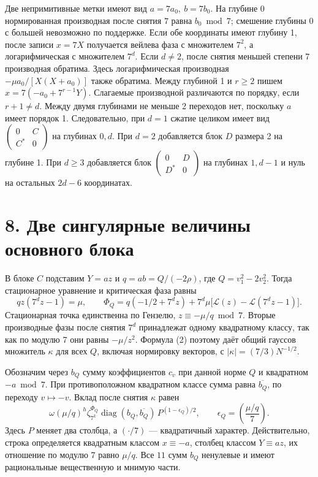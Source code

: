 \documentclass[11pt,a4paper]{article}
\newcommand{\C}{\mathbb C}
\newcommand{\sect}[1]{\section*{\sffamily\color{ink}#1}}
\newcommand{\diag}{\operatorname{diag}}
\begin{document}
Две непримитивные метки имеют вид \(a=7a_0,\ b=7b_0\). На глубине 0 нормированная производная после снятия \(7\) равна \(b_0\bmod7\); смешение глубины 0 с большей невозможно по поддержке. Если обе координаты имеют глубину 1, после записи \(x=7X\) получается вейлева фаза с множителем \(7^2\), а логарифмическая с множителем \(7^d\). Если \(d\ne2\), после снятия меньшей степени 7 производная обратима. Здесь логарифмическая производная \(-\mu a_0/[X(X+a_0)]\) также обратима. Между глубиной 1 и \(r\ge2\) пишем \(x=7(-a_0+7^{r-1}Y)\). Слагаемые производной различаются по порядку, если \(r+1\ne d\). Между двумя глубинами не меньше 2 переходов нет, поскольку \(a\) имеет порядок 1. Следовательно, при \(d=1\) сжатие целиком имеет вид
\(\left(\begin{smallmatrix}0&C\\C^*&0\end{smallmatrix}\right)\) на глубинах \(0,d\). При \(d=2\) добавляется блок \(D\) размера 2 на глубине 1. При \(d\ge3\) добавляется блок \(\left(\begin{smallmatrix}0&D\\D^*&0\end{smallmatrix}\right)\) на глубинах \(1,d-1\) и нуль на остальных \(2d-6\) координатах.
\newpage
\sect{8. Две сингулярные величины основного блока}
В блоке \(C\) подставим \(Y=az\) и \(q=ab=Q/(-2\rho)\), где \(Q=v_1^2-2v_2^2\). Тогда стационарное уравнение и критическая фаза равны
\[
  q z(7^d z-1)=\mu,\qquad
  \Phi_Q=q(-1/2+7^d z)+7^d\mu\big[\mathcal L(z)-\mathcal L(7^d z-1)\big].
                                                                  \tag{3}
\]
Стационарная точка единственна по Гензелю, \(z\equiv-\mu/q\bmod7\). Вторые производные фазы после снятия \(7^d\) принадлежат одному квадратному классу, так как по модулю 7 они равны \(-\mu/z^2\). Формула (2) поэтому даёт общий гауссов множитель \(\kappa\) для всех \(Q\), включая нормировку векторов, с \(|\kappa|=(7/3)N^{-1/2}\).

Обозначим через \(b_Q\) сумму коэффициентов \(c_v\) при данной норме \(Q\) и квадратном \(-a\bmod7\). При противоположном квадратном классе сумма равна \(\overline{b_Q}\), по переходу \(v\mapsto-v\). Вклад после снятия \(\kappa\) равен
\[
  \omega(\mu/q)^h\zeta_{7^k}^{\Phi_Q}
                      \diag(b_Q,\overline{b_Q})\,P^{(1-\epsilon_Q)/2},
  \qquad \epsilon_Q=\left(\frac{\mu/q}{7}\right).
\]
Здесь \(P\) меняет два столбца, а \((\cdot/7)\) --- квадратичный характер. Действительно, строка определяется квадратным классом \(x\equiv-a\), столбец классом \(Y\equiv az\), их отношение по модулю 7 равно \(\mu/q\). Все \(11\) сумм \(b_Q\) ненулевые и имеют рациональные вещественную и мнимую части.
\end{document}
